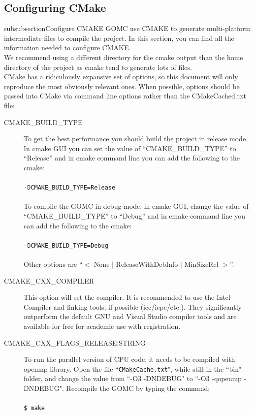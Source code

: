 \subsection{Configuring CMake}
subsubsection{Configure CMAKE}
GOMC use CMAKE to generate multi-platform intermediate files to compile the project. In this section, you can find all the information needed to configure CMAKE.\\
We recommend using a different directory for the cmake output than the home directory of the project as cmake tend to generate lots of files.\\
CMake has a ridiculously expansive set of options, so this document will only reproduce the most obviously relevant ones. When possible, options should be passed into CMake via command line options rather than the CMakeCached.txt file:
\begin{description}
\item [CMAKE\_BUILD\_TYPE] To get the best performance you should build the project in release mode. In cmake GUI you can set the value of ``CMAKE\_BUILD\_TYPE'' to ``Release'' and in cmake command line you can add the following to the cmake:\\\\
\texttt{-DCMAKE\_BUILD\_TYPE=Release}\\\\
To compile the GOMC in debug mode, in cmake GUI, change the value of ``CMAKE\_BUILD\_TYPE'' to ``Debug'' and in cmake command line you can add the following to the cmake:\\\\
\texttt{-DCMAKE\_BUILD\_TYPE=Debug}\\\\
Other options are ``$<$ None $\mid$ ReleaseWithDebInfo $\mid$ MinSizeRel $>$''.
\item [CMAKE\_CXX\_COMPILER] This option will set the compiler. It is recommended to use the Intel Compiler and linking tools, if possible (icc/icpc/etc.). They significantly outperform the default GNU and Visual Studio compiler tools and are available for free for academic use with registration.

\item [CMAKE\_CXX\_FLAGS\_RELEASE:STRING] To run the parallel version of CPU code, it needs to be compiled with openmp library. Open the file ``\texttt{CMakeCache.txt}", while still in the ``bin" folder, and change the value from ``-O3   -DNDEBUG" to ``-O3   -qopenmp   -DNDEBUG". Recompile the GOMC by typing the command:\\\\
\texttt{\$ make}\\


\end{description}
